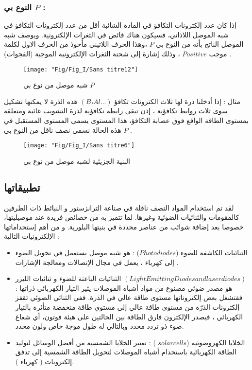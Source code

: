 \begin{enumerate}
	\subsubsection*{ النوع بي $ P $ :}
	
		 إذا كان عدد إلكترونات التكافؤ في المادة الشائبة أقل من عدد إلكترونات التكافؤ في شبه الموصل اللاذاتي، فسيكون هناك فائض في الثغرات الإلكترونية. ويوصف شبه الموصل الناتج بأنه من النوع بي  $ P $ ،وهذا الحرف اللاتيني مأخوذ من الحرف الاول لكلمة موجب $ Positive $ ، وذلك إشارة إلى شحنة الثغرات الإلكترونية الموجبة (الفجوات) . \cite{a19}
		
		\begin{figure}[bh]
			\centering
			\texttt{[image: "Fig/Fig\_I/Sans titre12"]}
			\caption{ 	شبه موصل من نوع بي $ P $  }
			\label{fig:sans-titre12}
		\end{figure}
		\FloatBarrier

		مثال : إذا أدخلنا ذرة لها ثلاث الكترونات تكافؤ $ (B،Al ...) $ هذه الذرة لا يمكنها تشكيل سوى ثلاث روابط تكافؤية ، إذن تبقى رابطة تكافؤية لذرة التشويب غائبة ومتعلقة بمستوى الطاقة الواقع فوق عصابة التكافؤ، هذا المستوى يسمى المستوى المستقبل في هذه الحالة نسمى نصف ناقل من النوع بي $ P $ .
		\begin{figure*}[h!]
			\centering
			\texttt{[image: "Fig/Fig\_I/Sans titre6"]}
			\caption{البنية الجزيئية لشبه موصل من نوع بي}
			\label{fig:sans-titre6}
		\end{figure*}
		\FloatBarrier
	
\end{enumerate}

\subsection{ تطبيقاتها}

لقد تم استخدام المواد النصف ناقلة في صناعة الترانزستور و النبائط ذات الطرفين كالمقومات والثنائيات الضوئية وغيرها. لما تتميز به من خصائص فريدة عند موصيليتها، خصوصا بعد إضافة شوائب من عناصر محددة في بنيتها البلورية. 
و من أهم إستخداماتها الإلكترونيات التالية :
\begin{itemize}
	\item 
	الثنائيات الكاشفة للضوء ($  ‫‪Photodiodes‬‬  $) : هو شبه موصل يستعمل في تحويل الضوء إلى كهرباء ، يعمل في مجال الإتصالات ومعالجة الإشارات . \cite{a15}
	\item
	الثنائيات الباعثة للضوء و ثنائيات الليزر ‫‪$ (Light‬‬ ‫‪Emitting‬‬ ‫‪Diodes‬‬ and‬ ‫‪laser‬‬ ‫‪diodes‬‬ ) $ : هو مصدر ضوئي مصنوع من مواد أشباه الموصلات يثير التيار الكهربائي ذراتها ففتشغل بعض إلكتروناتها مستوى طاقة عالي في الذرة. ففي الثنائي الضوئي تقفز إلكترونات الذرّة من مستوى طاقة عالي إلى مستوي طاقة منخفضة متأثرة بالتيار الكهربائي ، فيصدر الإلكترون فارق الطاقة بين الحالتين على هيئة فوتون، أي شعاع ضوء ذو تردد محدد وبالتالي له طول موجة خاص ولون محدد. \cite{a16}
	\item
	الخلايا الكهروضوئية ($  solar cells  $ ) : تعتبر الخلايا الشمسية من أفضل الوسائل لتوليد الطاقة الكهربائية باستخدام أشباه الموصلات لتحويل الطاقة الشمسية إلى تدفق إلكترونات ( كهرباء ). \cite{a17}
\end{itemize}

